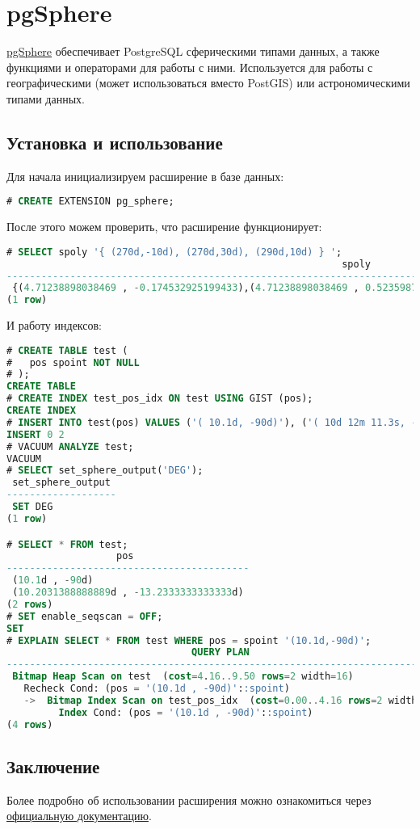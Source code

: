\section{pgSphere}

\href{http://pgsphere.github.io/}{pgSphere} обеспечивает PostgreSQL сферическими типами данных, а также функциями и операторами для работы с ними. Используется для работы с географическими (может использоваться вместо PostGIS) или астрономическими типами данных.

\subsection{Установка и использование}

Для начала инициализируем расширение в базе данных:

\begin{lstlisting}[language=SQL,label=lst:pgsphereinit,caption=Инициализация pgSphere]
# CREATE EXTENSION pg_sphere;
\end{lstlisting}

После этого можем проверить, что расширение функционирует:

\begin{lstlisting}[language=SQL,label=lst:pgsphereex1,caption=Проверка pgSphere]
# SELECT spoly '{ (270d,-10d), (270d,30d), (290d,10d) } ';
                                                          spoly
-------------------------------------------------------------------------------------------------------------------------
 {(4.71238898038469 , -0.174532925199433),(4.71238898038469 , 0.523598775598299),(5.06145483078356 , 0.174532925199433)}
(1 row)
\end{lstlisting}

И работу индексов:

\begin{lstlisting}[language=SQL,label=lst:pgsphereex2,caption=Проверка pgSphere]
# CREATE TABLE test (
#   pos spoint NOT NULL
# );
CREATE TABLE
# CREATE INDEX test_pos_idx ON test USING GIST (pos);
CREATE INDEX
# INSERT INTO test(pos) VALUES ('( 10.1d, -90d)'), ('( 10d 12m 11.3s, -13d 14m)');
INSERT 0 2
# VACUUM ANALYZE test;
VACUUM
# SELECT set_sphere_output('DEG');
 set_sphere_output
-------------------
 SET DEG
(1 row)

# SELECT * FROM test;
                   pos
------------------------------------------
 (10.1d , -90d)
 (10.2031388888889d , -13.2333333333333d)
(2 rows)
# SET enable_seqscan = OFF;
SET
# EXPLAIN SELECT * FROM test WHERE pos = spoint '(10.1d,-90d)';
                                QUERY PLAN
---------------------------------------------------------------------------
 Bitmap Heap Scan on test  (cost=4.16..9.50 rows=2 width=16)
   Recheck Cond: (pos = '(10.1d , -90d)'::spoint)
   ->  Bitmap Index Scan on test_pos_idx  (cost=0.00..4.16 rows=2 width=0)
         Index Cond: (pos = '(10.1d , -90d)'::spoint)
(4 rows)
\end{lstlisting}

\subsection{Заключение}

Более подробно об использовании расширения можно ознакомиться через \href{http://pgsphere.projects.pgfoundry.org/}{официальную документацию}.
